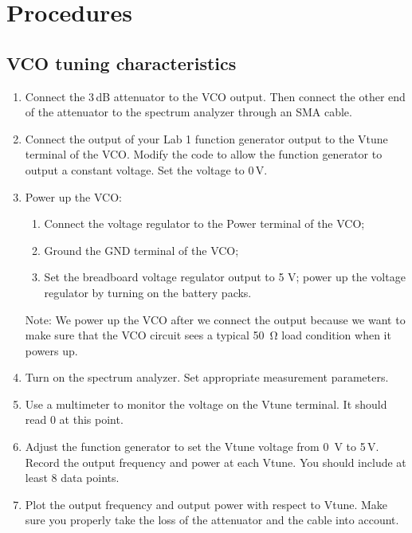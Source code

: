 \documentclass[letterpaper, 11pt]{article}
\begin{document}
\section{Procedures}

\subsection{VCO tuning characteristics}
\label{sec:vco_tuning}

\begin{enumerate}
	\item Connect the 3\,dB attenuator to the VCO output. Then connect the other end of the attenuator to the spectrum analyzer through an SMA cable. 
	
	\item Connect the output of your Lab 1 function generator output to the Vtune terminal of the VCO. Modify the code to allow the function generator to output a constant voltage. Set the voltage to 0\,V. 
	
	\item Power up the VCO:
		\begin{enumerate}
			\item 	Connect the voltage regulator to the Power terminal of the VCO; 
			\item 	Ground the GND terminal of the VCO;
			\item Set the breadboard voltage regulator output to 5 V; power up the voltage regulator by turning on the battery packs.
		\end{enumerate}  

		Note: We power up the VCO after we connect the output because we want to make sure that the VCO circuit sees a typical \SI{50}{\ohm} load condition when it powers up. 

	\item Turn on the spectrum analyzer. Set appropriate measurement parameters. 
	
	\item Use a multimeter to monitor the voltage on the Vtune terminal. It should read 0 at this point. 
	
	\item Adjust the function generator to set  the Vtune voltage from 0\, V to 5\,V. Record the output frequency and power at each Vtune. You should include at least 8 data points. 

	\item Plot the output frequency and output power with respect to Vtune. Make sure you properly take the loss of the attenuator and the cable into account. 


\end{enumerate}
\end{document}
